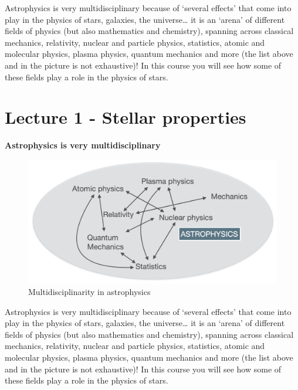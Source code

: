 \documentclass[
  letterpaper,
  DIV=11,
  numbers=noendperiod]{scrreprt}
\begin{document}
Astrophysics is very multidisciplinary because of `several effects' that
come into play in the physics of stars, galaxies, the universe\ldots{}
it is an `arena' of different fields of physics (but also mathematics
and chemistry), spanning across classical mechanics, relativity, nuclear
and particle physics, statistics, atomic and molecular physics, plasma
physics, quantum mechanics and more (the list above and in the picture
is not exhaustive)! In this course you will see how some of these fields
play a role in the physics of stars.


\hypertarget{lecture-1---stellar-properties-1}{%
\chapter*{Lecture 1 - Stellar
properties}\label{lecture-1---stellar-properties-1}}


\textbf{Astrophysics is very multidisciplinary}

\begin{figure}

{\centering \includegraphics{img/astrophysics_multidisciplinary.png}

}

\caption{Multidisciplinarity in astrophysics}

\end{figure}

Astrophysics is very multidisciplinary because of `several effects' that
come into play in the physics of stars, galaxies, the universe\ldots{}
it is an `arena' of different fields of physics (but also mathematics
and chemistry), spanning across classical mechanics, relativity, nuclear
and particle physics, statistics, atomic and molecular physics, plasma
physics, quantum mechanics and more (the list above and in the picture
is not exhaustive)! In this course you will see how some of these fields
play a role in the physics of stars.
\end{document}
